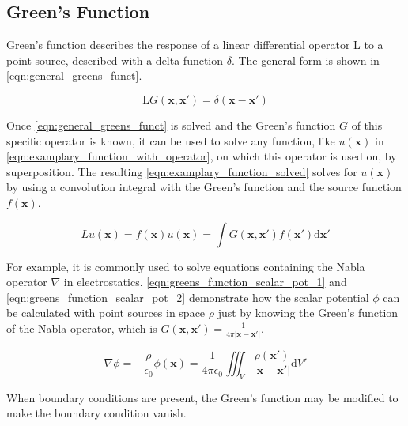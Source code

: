\subsection{Green's Function}

Green's function describes the response of a linear differential operator L to a point source, described with a delta-function $\delta$. The general form is shown in \autoref{eqn:general_greens_funct}. 

\begin{equation}
    \mathrm{L}G(\mathbf{x},\mathbf{x'}) = \delta(\mathbf{x}-\mathbf{x'})
    \label{eqn:general_greens_funct}
\end{equation}

Once \autoref{eqn:general_greens_funct} is solved and the Green's function $G$ of this specific operator is known, it can be used to solve any function, like $u(\mathbf{x})$ in \autoref{eqn:examplary_function_with_operator}, on which this operator is used on, by superposition. The resulting \autoref{eqn:examplary_function_solved} solves for $u(\mathbf{x})$ by using a convolution integral with the Green's function and the source function $f(\mathbf{x})$.

\begin{subequations}
\begin{equation}
    Lu(\mathbf{x}) = f(\mathbf{x})
    \label{eqn:examplary_function_with_operator}
\end{equation}

\begin{equation}
    u(\mathbf{x})=\int G(\mathbf{x},\mathbf{x'})f(\mathbf{x'})\mathrm{d}\mathbf{x'}
    \label{eqn:examplary_function_solved}
\end{equation}
\end{subequations}

For example, it is commonly used to solve equations containing the Nabla operator $\nabla$ in electrostatics. \autoref{eqn:greens_function_scalar_pot_1} and \autoref{eqn:greens_function_scalar_pot_2} demonstrate how the scalar potential $\phi$ can be calculated with point sources in space $\rho$ just by knowing the Green's function of the Nabla operator, which is $G(\mathbf{x},\mathbf{x'}) = \frac{1}{4\pi |\mathbf{x}-\mathbf{x'|}}$.

\begin{subequations}
\begin{equation}
    \nabla \phi = -\frac{\rho}{\epsilon_0}
    \label{eqn:greens_function_scalar_pot_1}
\end{equation}
\begin{equation}
    \phi(\mathbf{x}) = \frac{1}{4\pi\epsilon_0}\iiint_V\frac{\rho(\mathbf{x'})}{|\mathbf{x}-\mathbf{x'}|}\mathrm{d}V'
    \label{eqn:greens_function_scalar_pot_2}
\end{equation}
\end{subequations}

When boundary conditions are present, the Green's function may be modified to make the boundary condition vanish.

